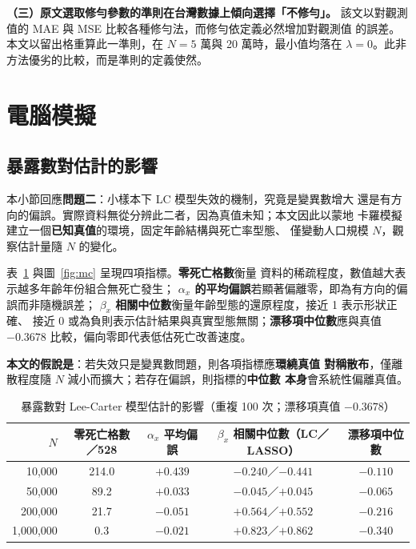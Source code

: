 \documentclass[UTF8, fontset=macnew, a4paper, 12pt]{ctexart}
\begin{document}
\textbf{（三）原文選取修勻參數的準則在台灣數據上傾向選擇「不修勻」。}
該文以對觀測值的 MAE 與 MSE 比較各種修勻法，而修勻依定義必然增加對觀測值
的誤差。本文以留出格重算此一準則，在 $N=5$ 萬與 20 萬時，最小值均落在
$\lambda=0$。此非方法優劣的比較，而是準則的定義使然。

\section{電腦模擬}

\subsection{暴露數對估計的影響}

本小節回應\textbf{問題二}：小樣本下 LC 模型失效的機制，究竟是變異數增大
還是有方向的偏誤。實際資料無從分辨此二者，因為真值未知；本文因此以蒙地
卡羅模擬建立一個\textbf{已知真值}的環境，固定年齡結構與死亡率型態、
僅變動人口規模 $N$，觀察估計量隨 $N$ 的變化。

表~\ref{tab:mc} 與圖~\ref{fig:mc} 呈現四項指標。\textbf{零死亡格數}衡量
資料的稀疏程度，數值越大表示越多年齡年份組合無死亡發生；
\textbf{$\alpha_x$ 的平均偏誤}若顯著偏離零，即為有方向的偏誤而非隨機誤差；
\textbf{$\beta_x$ 相關中位數}衡量年齡型態的還原程度，接近 1 表示形狀正確、
接近 0 或為負則表示估計結果與真實型態無關；\textbf{漂移項中位數}應與真值
$-0.3678$ 比較，偏向零即代表低估死亡改善速度。

\textbf{本文的假說是}：若失效只是變異數問題，則各項指標應\textbf{環繞真值
對稱散布}，僅離散程度隨 $N$ 減小而擴大；若存在偏誤，則指標的\textbf{中位數
本身}會系統性偏離真值。

\begin{table}[H]
\centering
\caption{暴露數對 Lee-Carter 模型估計的影響（重複 100 次；漂移項真值 $-0.3678$）}
\small
\begin{tabular}{rcccc}
\toprule
$N$ & 零死亡格數／528 & $\alpha_x$ 平均偏誤 & $\beta_x$ 相關中位數（LC／LASSO） & 漂移項中位數\\
\midrule
10,000    & 214.0 & $\mathbf{+0.439}$ & $-0.240$／$-0.441$ & $-0.110$\\
50,000    & 89.2  & $+0.033$ & $-0.045$／$+0.045$ & $-0.065$\\
200,000   & 21.7  & $-0.051$ & $+0.564$／$+0.552$ & $-0.216$\\
1,000,000 & 0.3   & $-0.021$ & $+0.823$／$+0.862$ & $-0.340$\\
\bottomrule
\end{tabular}
\label{tab:mc}
\end{table}
\end{document}

